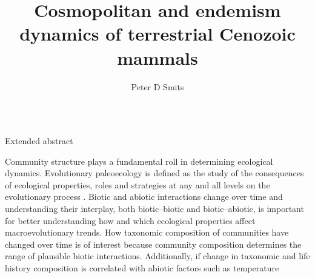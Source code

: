 \documentclass[final]{beamer}\usepackage[]{graphicx}\usepackage[]{color}
\title{Cosmopolitan and endemism dynamics of terrestrial Cenozoic mammals}
\author{Peter D Smits}
\institute{Committee on Evolutionary Biology, University of Chicago}
\newlength{\onecolwid}
\begin{document}
\begin{frame}[t]
  \begin{columns}[t]
    \begin{column}{\onecolwid}

    \begin{block}{Extended abstract}
%

        Community structure plays a fundamental roll in determining ecological dynamics. 
        Evolutionary paleoecology is defined as the study of the consequences of ecological properties, roles and strategies at any and all levels on the evolutionary process \citep{Kitchell1985a}. Biotic and abiotic interactions change over time and understanding their interplay, both biotic--biotic and biotic--abiotic, is important for better understanding how and which ecological properties affect macroevolutionary trends.
        How taxonomic composition of communities have changed over time is of interest because community composition determines the range of plausible biotic interactions. Additionally, if change in taxonomic and life history composition is correlated with abiotic factors such as temperature %


\end{block}
\end{column}
\end{columns}
\end{frame}
\end{document}
